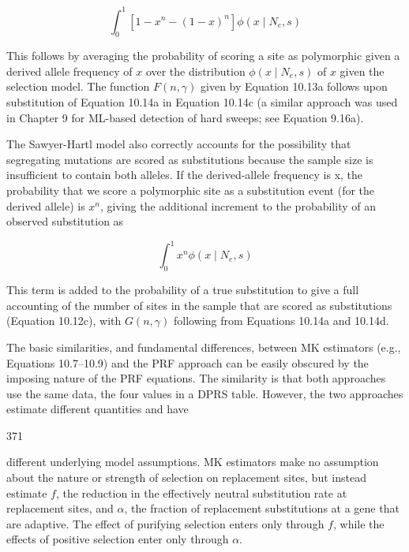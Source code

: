 \documentclass{article}
\begin{document}
\begin{equation}
\int_{0}^{1}\left[1-x^{n}-(1-x)^{n}\right]\phi(x\mid N_{e},s)
\tag{10.14c}
\label{eq:10_14c}
\end{equation}

This follows by averaging the probability of scoring a site as polymorphic given a derived allele frequency of  $ x $ over the distribution  $ \phi(x \mid N_e, s) $ of  $ x $ given the selection model. The function  $ F(n, \gamma) $ given by Equation 10.13a follows upon substitution of Equation 10.14a in Equation 10.14c (a similar approach was used in Chapter 9 for ML-based detection of hard sweeps; see Equation 9.16a).

The Sawyer-Hartl model also correctly accounts for the possibility that segregating mutations are scored as substitutions because the sample size is insufficient to contain both alleles. If the derived-allele frequency is x, the probability that we score a polymorphic site as a substitution event (for the derived allele) is  $ x^{n} $, giving the additional increment to the probability of an observed substitution as

\begin{equation}
\int_{0}^{1}x^{n}\phi(x\mid N_{e},s)
\tag{10.14d}
\label{eq:10_14d}
\end{equation}

This term is added to the probability of a true substitution to give a full accounting of the number of sites in the sample that are scored as substitutions (Equation 10.12c), with  $ G(n, \gamma) $ following from Equations 10.14a and 10.14d.

The basic similarities, and fundamental differences, between MK estimators (e.g., Equations 10.7–10.9) and the PRF approach can be easily obscured by the imposing nature of the PRF equations. The similarity is that both approaches use the same data, the four values in a DPRS table. However, the two approaches estimate different quantities and have

371

different underlying model assumptions. MK estimators make no assumption about the nature or strength of selection on replacement sites, but instead estimate  $ f $, the reduction in the effectively neutral substitution rate at replacement sites, and  $ \alpha $, the fraction of replacement substitutions at a gene that are adaptive. The effect of purifying selection enters only through  $ f $, while the effects of positive selection enter only through  $ \alpha $.
\end{document}
